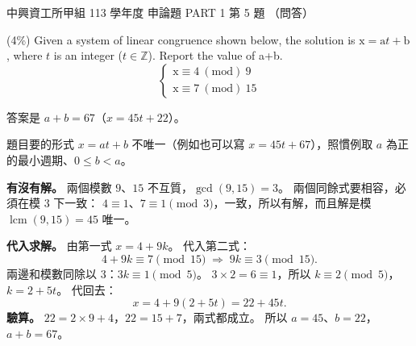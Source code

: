 \begin{pastexam}[label={px:nchu-113-dsa-23}]{中興資工所甲組 113 學年度 申論題 PART 1 第 5 題}
（問答）

(4\%) Given a system of linear congruence shown below, the solution is $\mathrm{x}=\mathrm{a}t+\mathrm{b}$,
where $t$ is an integer ($t\in\mathbb{Z}$). Report the value of a+b.
\[
\begin{cases}
\mathrm{x}\equiv 4\ (\mathrm{mod})\ 9\\
\mathrm{x}\equiv 7\ (\mathrm{mod})\ 15
\end{cases}
\]
\end{pastexam}

\begin{pastsoln}
答案是 $a + b = 67$（$x = 45t + 22$）。

題目要的形式 $x = at + b$ 不唯一（例如也可以寫 $x = 45t + 67$），照慣例取 $a$ 為正的最小週期、$0 \le b < a$。

\textbf{有沒有解。} 兩個模數 $9$、$15$ 不互質，$\gcd(9, 15) = 3$。 兩個同餘式要相容，必須在模 $3$ 下一致：
$4 \equiv 1$、$7 \equiv 1 \pmod 3$，一致，所以有解，而且解是模 $\operatorname{lcm}(9, 15) = 45$ 唯一。

\textbf{代入求解。} 由第一式 $x = 4 + 9k$。 代入第二式：
\[
4 + 9k \equiv 7 \pmod{15} \;\Longrightarrow\; 9k \equiv 3 \pmod{15}.
\]
兩邊和模數同除以 $3$：$3k \equiv 1 \pmod 5$。 $3 \times 2 = 6 \equiv 1$，所以 $k \equiv 2 \pmod 5$，
$k = 2 + 5t$。 代回去：
\[
x = 4 + 9(2 + 5t) = 22 + 45t.
\]
\textbf{驗算。} $22 = 2 \times 9 + 4$，$22 = 15 + 7$，兩式都成立。 所以 $a = 45$、$b = 22$，$a + b = 67$。
\end{pastsoln}
